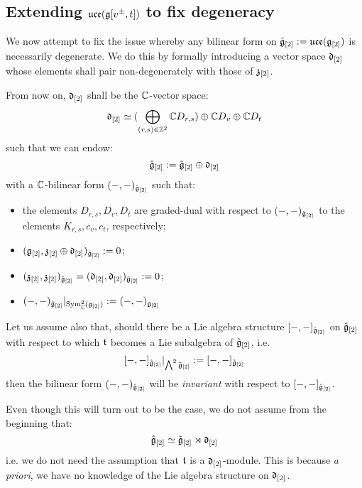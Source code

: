         \subsection{Extending \texorpdfstring{$ \mathfrak{uce}(\mathfrak{g}[v^{\pm}, t]) $}{} to fix degeneracy}
            We now attempt to fix the issue whereby any bilinear form on $\tilde{\mathfrak{g}}_{[2]}:= \mathfrak{uce}(\mathfrak{g}_{[2]})$ is necessarily degenerate. We do this by formally introducing a  vector space $\mathfrak{d}_{[2]}$ whose elements shall pair non-degenerately with those of $\mathfrak{z}_{[2]}$. 
            \begin{convention} \label{conv: orthogonal_complement_of_toroidal_centres}
                From now on, $\mathfrak{d}_{[2]}$ shall be the $\mathbb{C}$-vector space:
                    $$\mathfrak{d}_{[2]} \simeq ( \bigoplus_{(r, s) \in \mathbb{Z}^2} \mathbb{C} D_{r, s} ) \oplus \mathbb{C} D_v \oplus \mathbb{C} D_t$$
                such that we can endow:
                    $$\hat{\mathfrak{g}}_{[2]} := \tilde{\mathfrak{g}}_{[2]}\oplus \mathfrak{d}_{[2]}$$
                with a $\mathbb{C}$-bilinear form $(-, -)_{\hat{\mathfrak{g}}_{[2]}}$ such that:
                \begin{itemize}
                    \item the elements $D_{r, s}, D_v, D_t$ are graded-dual with respect to $(-, -)_{\hat{\mathfrak{g}}_{[2]}}$ to the elements $K_{r, s}, c_v, c_t$, respectively;
                    \item $(\mathfrak{g}_{[2]}, \mathfrak{z}_{[2]} \oplus \mathfrak{d}_{[2]})_{\hat{\mathfrak{g}}_{[2]}} := 0$;
                    \item $(\mathfrak{z}_{[2]}, \mathfrak{z}_{[2]})_{\hat{\mathfrak{g}}_{[2]}} = (\mathfrak{d}_{[2]}, \mathfrak{d}_{[2]})_{\hat{\mathfrak{g}}_{[2]}} := 0$;
                    \item $(-, -)_{\hat{\mathfrak{g}}_{[2]}}|_{\mathrm{Sym}^2_{\mathbb{C}}(\mathfrak{g}_{[2]})} := (-, -)_{\mathfrak{g}_{[2]}}$
                \end{itemize}
            \end{convention}
            \begin{convention}
                Let us assume also that, should there be a Lie algebra structure $[-, -]_{\hat{\mathfrak{g}}_{[2]}}$ on $\hat{\mathfrak{g}}_{[2]}$ with respect to which $\mathfrak{t}$ becomes a Lie subalgebra of $\hat{\mathfrak{g}}_{[2]}$, i.e.
                    $$[-, -]_{\hat{\mathfrak{g}}_{[2]}}|_{\bigwedge^2 \tilde{\mathfrak{g}}_{[2]}} := [-, -]_{\tilde{\mathfrak{g}}_{[2]}}$$
                then the bilinear form $(-, -)_{\hat{\mathfrak{g}}_{[2]}}$ will be \textit{invariant} with respect to $[-, -]_{\hat{\mathfrak{g}}_{[2]}}$.

                Even though this will turn out to be the case, we do not assume from the beginning that:
                    $$\hat{\mathfrak{g}}_{[2]} \simeq \tilde{\mathfrak{g}}_{[2]}\rtimes \mathfrak{d}_{[2]}$$
                i.e. we do not need the assumption that $\mathfrak{t}$ is a $\mathfrak{d}_{[2]}$-module. This is because \textit{a priori}, we have no knowledge of the Lie algebra structure on $\mathfrak{d}_{[2]}$.
            \end{convention}

